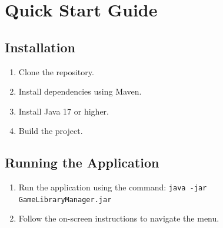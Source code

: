 \documentclass[paper=a4,fontsize=12pt,parskip=half*]{scrartcl}
\begin{document}
\pagebreak


\section{Quick Start Guide}
\subsection*{Installation}
\begin{enumerate}
	\item Clone the repository.
	\item Install dependencies using Maven\cite{Maven}.
	\item Install Java 17 or higher.\cite{Java}
	\item Build the project.
\end{enumerate}

\subsection{Running the Application}
\begin{enumerate}
	\item Run the application using the command: \texttt{java -jar GameLibraryManager.jar}
	\item Follow the on-screen instructions to navigate the menu.
\end{enumerate}

\clearpage
\renewcommand\refname{Literaturverzeichnis}


\end{document}
